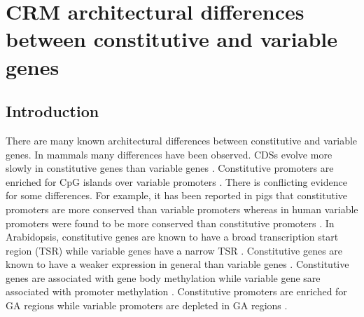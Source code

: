 \documentclass[../main.tex]{subfiles}
\begin{document}
	
\chapter{CRM architectural differences between constitutive and variable genes}
\label{chapter1}

\section{Introduction}
\label{chapter1:introduction}
There are many known architectural differences between constitutive and variable genes.
In mammals many differences have been observed. CDSs evolve more slowly in constitutive genes than variable genes \autocite{zhangMammalianHousekeepingGenes2004}.
Constitutive promoters are enriched for CpG islands over variable promoters \autocite{carninciGenomewideAnalysisMammalian2006}.
There is conflicting evidence for some differences.
For example, it has been reported in pigs that constitutive promoters are more conserved than variable promoters \autocite{weiCharacterizationGenePromoters2019} whereas in human variable promoters were found to be more conserved than constitutive promoters \autocite{farreHousekeepingGenesTend2007}.
In Arabidopsis, constitutive genes are known to have a broad transcription start region (TSR) while variable genes have a narrow TSR \autocite{mortonPairedEndAnalysisTranscription2014}.
Constitutive genes are known to have a weaker expression in general than variable genes \autocite{czechowskiGenomeWideIdentificationTesting2005,mortonPairedEndAnalysisTranscription2014}.
Constitutive genes are associated with gene body methylation \autocite{zhangGenomewideHighResolutionMapping2006, takunoBodyMethylatedGenesArabidopsis2012,aceitunoRulesGeneExpression2008} while variable gene sare associated with promoter methylation \autocite{zhangGenomewideHighResolutionMapping2006}.
Constitutive promoters are enriched for GA regions while variable promoters are depleted in GA regions \autocite{yamamotoHeterogeneityArabidopsisCore2009}. 
\end{document}
